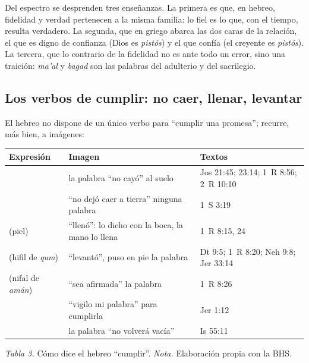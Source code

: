 
Del espectro se desprenden tres enseñanzas. La primera es que, en hebreo, fidelidad y verdad pertenecen a la misma familia: lo fiel es lo que, con el tiempo, resulta verdadero. La segunda, que en griego  abarca las dos caras de la relación, el que es digno de confianza (Dios es \emph{pistós}) y el que confía (el creyente es \emph{pistós}). La tercera, que lo contrario de la fidelidad no es ante todo un error, sino una traición: \emph{ma'al} y \emph{bagad} son las palabras del adulterio y del sacrilegio.

\subsection{Los verbos de cumplir: no caer, llenar, levantar}
El hebreo no dispone de un único verbo para ``cumplir una promesa''; recurre, más bien, a imágenes:

\begin{center}\small\renewcommand{\arraystretch}{1.2}
\begin{tabular}{@{}L{3.6cm}L{6.6cm}L{4.2cm}@{}}
\toprule
\textbf{Expresión} & \textbf{Imagen} & \textbf{Textos} \\ \midrule
{} & la palabra ``no cayó'' al suelo & Jos 21:45; 23:14; 1~R 8:56; 2~R 10:10 \\
 & ``no dejó caer a tierra'' ninguna palabra & 1~S 3:19 \\
 (piel) & ``llenó'': lo dicho con la boca, la mano lo llena & 1~R 8:15, 24 \\
 (hifil de \emph{qum}) & ``levantó'', puso en pie la palabra & Dt 9:5; 1~R 8:20; Neh 9:8; Jer 33:14 \\
 (nifal de \emph{amán}) & ``sea afirmada'' la palabra & 1~R 8:26 \\
 & ``vigilo mi palabra'' para cumplirla & Jer 1:12 \\
 & la palabra ``no volverá vacía'' & Is 55:11 \\
\bottomrule
\end{tabular}\par
{\footnotesize\color{gris}\textit{Tabla 3.} Cómo dice el hebreo ``cumplir''. \textit{Nota.} Elaboración propia con la BHS.}
\end{center}

